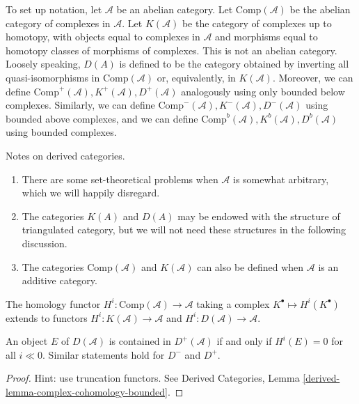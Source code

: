 \noindent
To set up notation, let $\mathcal{A}$ be an abelian category. Let
$\text{Comp}(\mathcal{A})$ be the abelian category of complexes in
$\mathcal{A}$. Let $K(\mathcal{A})$ be the category of complexes up to
homotopy, with objects equal to complexes in $\mathcal{A}$ and morphisms
equal to
homotopy classes of morphisms of complexes. This is not an abelian category.
Loosely speaking, $D(A)$ is defined to be the category obtained by inverting
all quasi-isomorphisms in $\text{Comp}(\mathcal{A})$ or, equivalently, in
$K(\mathcal{A})$. Moreover, we can define $\text{Comp}^+(\mathcal{A}),
K^+(\mathcal{A}), D^+(\mathcal{A})$ analogously using only bounded below
complexes. Similarly, we can define $\text{Comp}^-(\mathcal{A}),
K^-(\mathcal{A}), D^-(\mathcal{A})$ using bounded above complexes, and we can
define $\text{Comp}^b(\mathcal{A}), K^b(\mathcal{A}), D^b(\mathcal{A})$ using
bounded complexes.

\begin{remark}
\label{remarks-derived-categories}
Notes on derived categories.
\begin{enumerate}
\item
There are some set-theoretical problems when $\mathcal{A}$ is somewhat
arbitrary, which we will happily disregard.
\item
The categories $K(A)$ and $D(A)$ may be endowed with the structure of
triangulated category, but we will not need these structures in the following
discussion.
\item
The categories $\text{Comp}(\mathcal{A})$ and $K(\mathcal{A})$ can also be
defined when $\mathcal{A}$ is an additive category.
\end{enumerate}
\end{remark}

\noindent
The homology functor $H^i : \text{Comp}(\mathcal{A}) \to \mathcal{A}$ taking a
complex $K^\bullet \mapsto H^i(K^\bullet)$ extends to functors $H^i :
K(\mathcal{A}) \to \mathcal{A}$ and $H^i : D(\mathcal{A}) \to \mathcal{A}$.

\begin{lemma}
\label{lemma-when-in-bounded}
An object $E$ of $D(\mathcal{A})$ is contained in $D^+(\mathcal{A})$ if and
only if $H^i(E) =0 $ for all $i \ll 0$. Similar statements hold for $D^-$ and
$D^+$.
\end{lemma}

\begin{proof}
Hint: use truncation functors. See
Derived Categories, Lemma \ref{derived-lemma-complex-cohomology-bounded}.
\end{proof}

